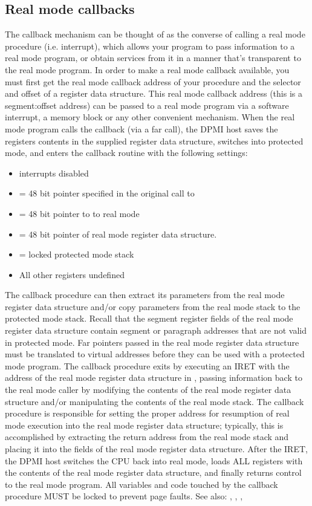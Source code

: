 \subsection{Real mode callbacks}
The callback mechanism can be thought of as the converse of calling a real
mode procedure (i.e. interrupt), which allows your program to pass
information to a real mode program, or obtain services from it in a manner
that's transparent to the real mode program.
In order to make a real mode callback available, you must first get the real
mode callback address of your procedure and the selector and offset of a
register data structure. This real mode callback address (this is a
segment:offset address) can be passed to a real mode program via a software
interrupt, a \dos memory block or any other convenient mechanism.
When the real mode program calls the callback (via a far call), the DPMI
host saves the registers contents in the supplied register data structure,
switches into protected mode, and enters the callback routine with the
following settings:
\begin{itemize}
\item interrupts disabled
\item {} = 48 bit pointer specified in the original call to 
\item {} = 48 bit pointer to to real mode 
\item {} = 48 bit pointer of real mode register data
structure. 
\item {} = locked protected mode stack
\item  All other registers undefined
\end{itemize}
The callback procedure can then extract its parameters from the real mode
register data structure and/or copy parameters from the real mode stack to
the protected mode stack. Recall that the segment register fields of the
real mode register data structure contain segment or paragraph addresses
that are not valid in protected mode. Far pointers passed in the real mode
register data structure must be translated to virtual addresses before they
can be used with a protected mode program.
The callback procedure exits by executing an IRET with the address of the
real mode register data structure in , passing information back to
the real mode caller by modifying the contents of the real mode register
data structure and/or manipulating the contents of the real mode stack. The
callback procedure is responsible for setting the proper address for
resumption of real mode execution into the real mode register data
structure; typically, this is accomplished by extracting the return address
from the real mode stack and placing it into the  fields of the real
mode register data structure. After the IRET, the DPMI host switches the CPU
back into real mode, loads ALL registers with the contents of the real mode
register data structure, and finally returns control to the real mode
program.
All variables and code touched by the callback procedure MUST be locked to
prevent page faults.
See also: ,
, 
, 
